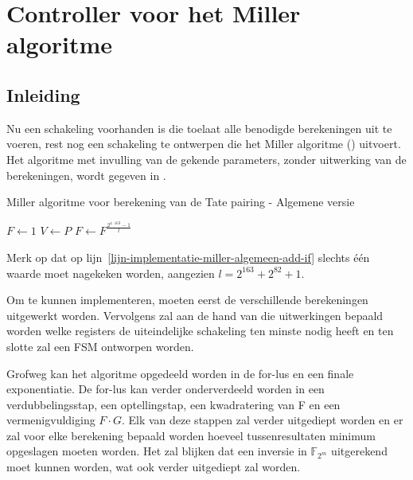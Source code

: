 \section{Controller voor het Miller algoritme}\label{sectie-implementatie-miller}


\subsection{Inleiding}\label{subsectie-implementatie-miller-inleiding}

Nu een schakeling voorhanden is die toelaat alle benodigde berekeningen uit te voeren, rest nog een schakeling te ontwerpen die het Miller algoritme () uitvoert. Het algoritme met invulling van de gekende parameters, zonder uitwerking van de berekeningen, wordt gegeven in .

\begin{algorithm}[h]
	\caption{Miller algoritme voor berekening van de Tate pairing - Algemene versie}
	\label{algoritme-implementatie-miller-algemeen}
	$F \leftarrow 1$\;
	$V \leftarrow P$\;
	$F \leftarrow F^{\frac{2^{4 \cdot 163} - 1}{l}}$\;
\end{algorithm}

Merk op dat op lijn~\ref{lijn-implementatie-miller-algemeen-add-if} slechts \'e\'en waarde moet nagekeken worden, aangezien $l = 2^{163} + 2^{82} + 1$.

Om  te kunnen implementeren, moeten eerst de verschillende berekeningen uitgewerkt worden. Vervolgens zal aan de hand van die uitwerkingen bepaald worden welke registers de uiteindelijke schakeling ten minste nodig heeft en ten slotte zal een FSM ontworpen worden.

Grofweg kan het algoritme opgedeeld worden in de for-lus  en een finale exponentiatie. De for-lus kan verder onderverdeeld worden in een verdubbelingsstap, een optellingstap, een kwadratering van F en een vermenigvuldiging $F \cdot G$. Elk van deze stappen zal verder uitgediept worden en er zal voor elke berekening bepaald worden hoeveel tussenresultaten minimum opgeslagen moeten worden. Het zal blijken dat een inversie in $\mathbb{F}_{2^m}$ uitgerekend moet kunnen worden, wat ook verder uitgediept zal worden.

